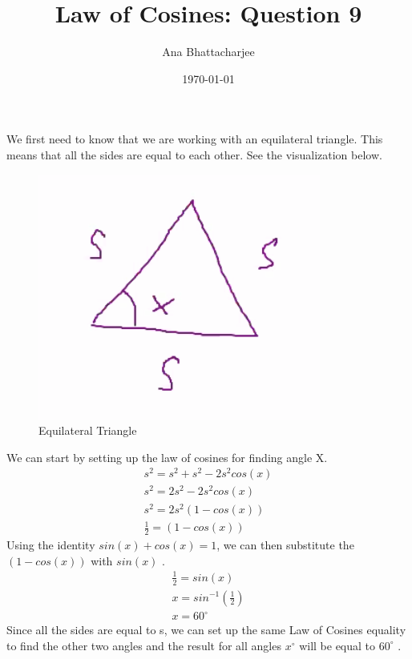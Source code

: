 \documentclass{article}
\begin{document}
\title{Law of Cosines: Question 9}
\author{Ana Bhattacharjee}
\date{\today}
\maketitle{}

\begin{center}
We first need to know that we are working with an equilateral triangle. This means that all the sides are equal to each other. See the visualization below.
\begin{figure}[!htbp]
  \caption{Equilateral Triangle}
  \includegraphics{triangle}
\end{figure}
We can start by setting up the law of cosines for finding angle X.
\begin{align}
s^2 = s^2 + s^2 - 2s^2 cos(x) \\
s^2 = 2s^2 - 2s^2cos(x) \\
s^2 = 2s^2 (1 - cos(x)) \\
\frac{1}{2} = (1 - cos(x))
\end{align}
Using the identity $sin(x) + cos(x) = 1$, we can then substitute the $(1 - cos(x))$ with $sin(x)$ .
\begin{align}
\frac{1}{2} = sin(x) \\
x = sin^{-1}(\frac{1}{2}) \\
x = 60^{\circ}
\end{align}
Since all the sides are equal to s, we can set up the same Law of Cosines equality to find the other two angles and the result for all angles $x^{\circ}$ will be equal to $60^{\circ}$ .  
\end{center}
\end{document}
